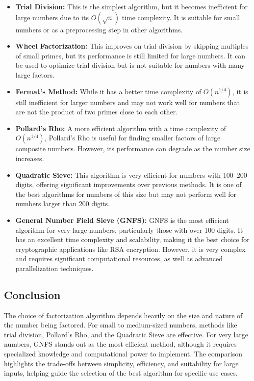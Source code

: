\documentclass[12pt]{report}
\begin{document}
\begin{itemize}
    \item \textbf{Trial Division:} This is the simplest algorithm, but it becomes inefficient for large numbers due to its $O(\sqrt{n})$ time complexity. It is suitable for small numbers or as a preprocessing step in other algorithms.
    
    \item \textbf{Wheel Factorization:} This improves on trial division by skipping multiples of small primes, but its performance is still limited for large numbers. It can be used to optimize trial division but is not suitable for numbers with many large factors.
    
    \item \textbf{Fermat's Method:} While it has a better time complexity of $O(n^{1/4})$, it is still inefficient for larger numbers and may not work well for numbers that are not the product of two primes close to each other.
    
    \item \textbf{Pollard's Rho:} A more efficient algorithm with a time complexity of $O(n^{1/4})$, Pollard's Rho is useful for finding smaller factors of large composite numbers. However, its performance can degrade as the number size increases.
    
    \item \textbf{Quadratic Sieve:} This algorithm is very efficient for numbers with 100–200 digits, offering significant improvements over previous methods. It is one of the best algorithms for numbers of this size but may not perform well for numbers larger than 200 digits.
    
    \item \textbf{General Number Field Sieve (GNFS):} GNFS is the most efficient algorithm for very large numbers, particularly those with over 100 digits. It has an excellent time complexity and scalability, making it the best choice for cryptographic applications like RSA encryption. However, it is very complex and requires significant computational resources, as well as advanced parallelization techniques.
\end{itemize}

\subsection{Conclusion}

The choice of factorization algorithm depends heavily on the size and nature of the number being factored. For small to medium-sized numbers, methods like trial division, Pollard's Rho, and the Quadratic Sieve are effective. For very large numbers, GNFS stands out as the most efficient method, although it requires specialized knowledge and computational power to implement. The comparison highlights the trade-offs between simplicity, efficiency, and suitability for large inputs, helping guide the selection of the best algorithm for specific use cases.
\end{document}
